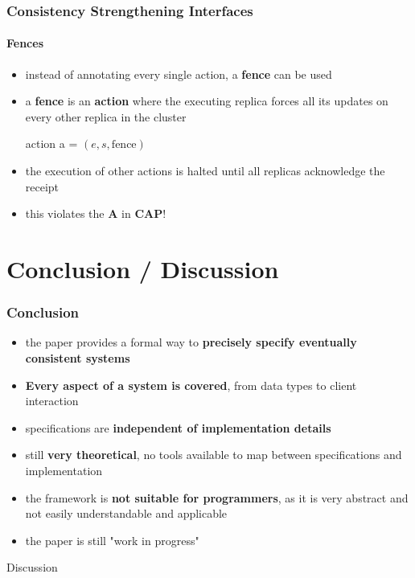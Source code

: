 \documentclass[11pt]{beamer}
\begin{document}
\begin{frame}
\frametitle{Consistency Strengthening Interfaces}
\framesubtitle{Fences}
\begin{itemize}
\item instead of annotating every single action, a \textbf{fence} can be used
\item a \textbf{fence} is an \textbf{action} where the executing replica forces all its updates on every other replica in the cluster
\begin{center} action a =  \((e,s, \mathrm{fence})\)\end{center} 
\item the execution of other actions is halted until all replicas acknowledge the receipt
\pause
\item this violates the \textbf{A} in \textbf{CAP}!
\end{itemize}
\end{frame}

\section{Conclusion / Discussion}

\begin{frame}
\frametitle{Conclusion}
\begin{itemize}
\item<pro@1-> the paper provides a formal way to \textbf{precisely specify eventually consistent systems}
\item<pro@1-> \textbf{Every aspect of a system is covered}, from data types to client interaction
\item<pro@1-> specifications are \textbf{independent of implementation details}
\item<con@1-> still \textbf{very theoretical}, no tools available to map between specifications and implementation 
\item<con@1-> the framework is \textbf{not suitable for programmers}, as it is very abstract and not easily understandable and applicable
\item<con@1-> the paper is still "work in progress"
\end{itemize}
\end{frame}

\begin{frame}
\begin{center}
\begin{Huge}
Discussion
\end{Huge}
\end{center}
\end{frame}
\end{document}
